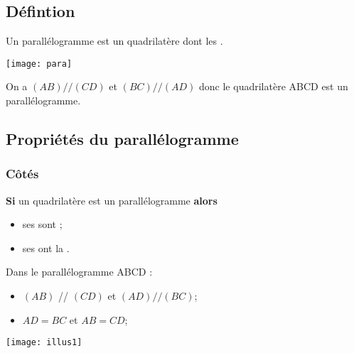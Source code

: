 \subsection{Défintion}

\begin{mydef}
	Un parallélogramme est un quadrilatère dont les .
\end{mydef}

\begin{myex}
		
		
		\begin{center}
			\texttt{[image: para]}
		\end{center}
	
	On a $(AB) // (CD)$ et $(BC) // (AD)$ donc le quadrilatère ABCD est un parallélogramme.
\end{myex}

\subsection{Propriétés du parallélogramme}

	\subsubsection*{Côtés}
	\begin{myprops}
		\textbf{Si} un quadrilatère est un parallélogramme \textbf{alors} 
		\begin{itemize}
			\item ses  sont ;
			\item ses  ont la .			
		\end{itemize}
		
		
	\end{myprops}

	\begin{myex}
		\begin{multicols}{2}
			Dans le parallélogramme ABCD :
			\begin{itemize}
				\item $(AB)$ // $(CD)$ et $(AD) // (BC)$;
				\item $AD = BC$ et $AB = CD$;				
			\end{itemize}
			
			
			
			\begin{center}
				\texttt{[image: illus1]}
			\end{center}
		\end{multicols}
	\end{myex}

